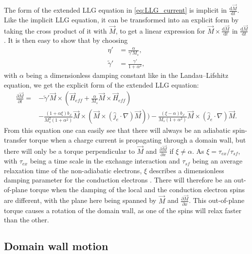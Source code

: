 \documentclass[12pt, a4paper, twoside, openright]{article}		%
\numberwithin{equation}{section}
\begin{document}
The form of the extended LLG equation in \eqref{eq:LLG_current} is implicit in $\frac{\textrm{d} \vec{M}}{\textrm{d} t}$. Like the implicit LLG equation, it can be transformed into an explicit form by taking the cross product of it with $\vec{M}$, to get a linear expression for $\vec{M}\times\frac{\textrm{d} \vec{M}}{\textrm{d} t}$ in $\frac{\textrm{d} \vec{M}}{\textrm{d} t}$. It is then easy to show that by choosing
\begin{align}
\eta' &= \frac{\alpha}{\gamma ' M_s}, \\
\tilde{\gamma}' &= \frac{\gamma '}{1+\alpha^2},
\end{align}
with $\alpha$ being a dimensionless damping constant like in the Landau--Lifshitz equation, we get the explicit form of the extended LLG equation:
\begin{align}
\nonumber \frac{\partial \vec{M}}{\partial t} = &-\tilde{\gamma}' \vec{M} \times  \left(\vec{H}_{eff} + \frac{\alpha}{M_s} \vec{M}\times \vec{H}_{eff}\right) \\ 
&- \frac{(1+\alpha\xi) b_J}{M_s^2(1+\alpha^2)} \vec{M}\times (\vec{M}\times(\hat{j}_e\cdot\nabla)\vec{M})) - \frac{(\xi-\alpha)b_J}{ M_s(1+\alpha^2)}\vec{M}\times(\hat{j}_e\cdot\nabla)\vec{M}.
\label{eq:LLG_current_explicit}
\end{align}
From this equation one can easily see that there will always be an adiabatic spin-transfer torque when a charge current is propagating through a domain wall, but there will only be a torque perpendicular to $\vec{M}$ and $\frac{\partial\vec{M}}{\partial x}$ if $\xi \neq \alpha$. As $\xi = \tau_{ex}/\tau_{sf}$, with $\tau_{ex}$ being a time scale in the exchange interaction and $\tau_{sf}$ being an average relaxation time of the non-adiabatic electrons, $\xi$ describes a dimensionless damping parameter for the conduction electrons \cite{kruger2006current}. There will therefore be an out-of-plane torque when the damping of the local and the conduction electron spins are different, with the plane here being spanned by $\vec{M}$ and $\frac{\partial\vec{M}}{\partial x}$. This out-of-plane torque causes a rotation of the domain wall, as one of the spins will relax faster than the other.

\subsection{Domain wall motion}
\end{document}

